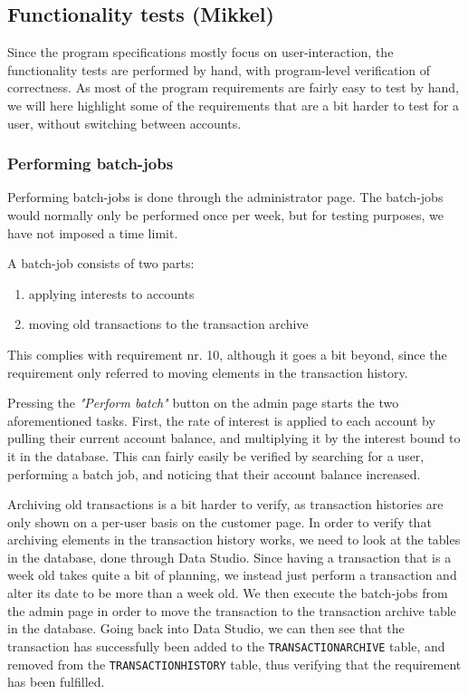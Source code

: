 \subsection{Functionality tests (Mikkel)}
\label{sec:functionalitytests}
Since the program specifications mostly focus on user-interaction, the functionality tests are performed by hand, with program-level verification of correctness. As most of the program requirements are fairly easy to test by hand, we will here highlight some of the requirements that are a bit harder to test for a user, without switching between accounts.

\subsubsection{Performing batch-jobs}
Performing batch-jobs is done through the administrator page. The batch-jobs would normally only be performed once per week, but for testing purposes, we have not imposed a time limit.

A batch-job consists of two parts:
\begin{enumerate}
    \item applying interests to accounts
    \item moving old transactions to the transaction archive
\end{enumerate}
This complies with requirement nr. 10, although it goes a bit beyond, since the requirement only referred to moving elements in the transaction history. 

Pressing the \textit{"Perform batch"} button on the admin page starts the two aforementioned tasks. First, the rate of interest is applied to each account by pulling their current account balance, and multiplying it by the interest bound to it in the database. This can fairly easily be verified by searching for a user, performing a batch job, and noticing that their account balance increased. 

Archiving old transactions is a bit harder to verify, as transaction histories are only shown on a per-user basis on the customer page. In order to verify that archiving elements in the transaction history works, we need to look at the tables in the database, done through Data Studio. Since having a transaction that is a week old takes quite a bit of planning, we instead just perform a transaction and alter its date to be more than a week old. We then execute the batch-jobs from the admin page in order to move the transaction to the transaction archive table in the database. Going back into Data Studio, we can then see that the transaction has successfully been added to the \texttt{TRANSACTIONARCHIVE} table, and removed from the \texttt{TRANSACTIONHISTORY} table, thus verifying that the requirement has been fulfilled.

